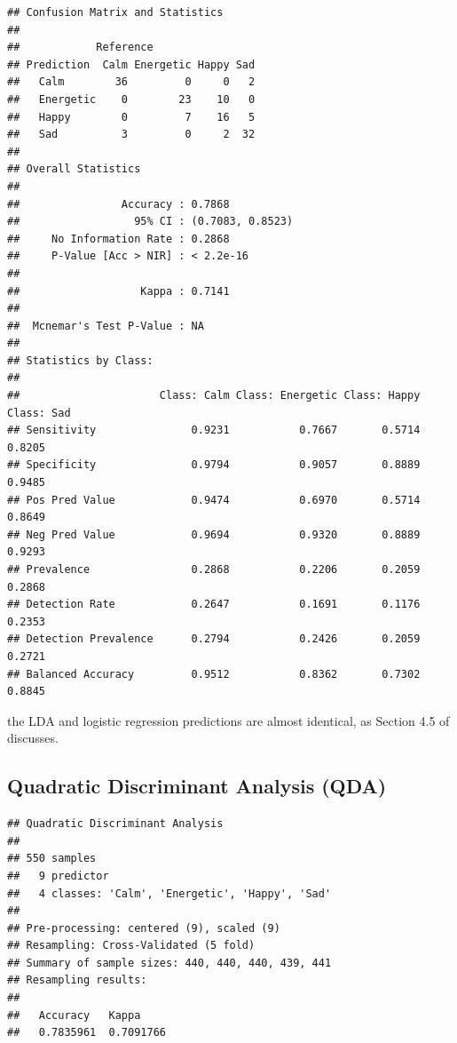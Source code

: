 \documentclass[11pt,]{article}
\begin{document}
\begin{verbatim}
## Confusion Matrix and Statistics
## 
##            Reference
## Prediction  Calm Energetic Happy Sad
##   Calm        36         0     0   2
##   Energetic    0        23    10   0
##   Happy        0         7    16   5
##   Sad          3         0     2  32
## 
## Overall Statistics
##                                           
##                Accuracy : 0.7868          
##                  95% CI : (0.7083, 0.8523)
##     No Information Rate : 0.2868          
##     P-Value [Acc > NIR] : < 2.2e-16       
##                                           
##                   Kappa : 0.7141          
##                                           
##  Mcnemar's Test P-Value : NA              
## 
## Statistics by Class:
## 
##                      Class: Calm Class: Energetic Class: Happy Class: Sad
## Sensitivity               0.9231           0.7667       0.5714     0.8205
## Specificity               0.9794           0.9057       0.8889     0.9485
## Pos Pred Value            0.9474           0.6970       0.5714     0.8649
## Neg Pred Value            0.9694           0.9320       0.8889     0.9293
## Prevalence                0.2868           0.2206       0.2059     0.2868
## Detection Rate            0.2647           0.1691       0.1176     0.2353
## Detection Prevalence      0.2794           0.2426       0.2059     0.2721
## Balanced Accuracy         0.9512           0.8362       0.7302     0.8845
\end{verbatim}

the LDA and logistic regression predictions are almost identical, as
Section 4.5 of \citep{book} discusses.

\hypertarget{quadratic-discriminant-analysis-qda}{%
\subsection{Quadratic Discriminant Analysis
(QDA)}\label{quadratic-discriminant-analysis-qda}}

\begin{verbatim}
## Quadratic Discriminant Analysis 
## 
## 550 samples
##   9 predictor
##   4 classes: 'Calm', 'Energetic', 'Happy', 'Sad' 
## 
## Pre-processing: centered (9), scaled (9) 
## Resampling: Cross-Validated (5 fold) 
## Summary of sample sizes: 440, 440, 440, 439, 441 
## Resampling results:
## 
##   Accuracy   Kappa    
##   0.7835961  0.7091766
\end{verbatim}
\end{document}
